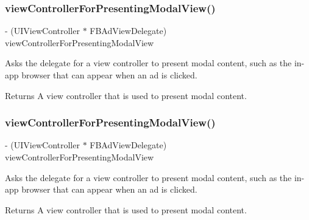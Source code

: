 \subsubsection{\texorpdfstring{view\+Controller\+For\+Presenting\+Modal\+View()}{viewControllerForPresentingModalView()}\hspace{0.1cm}{\footnotesize\ttfamily [2/5]}}
{\footnotesize\ttfamily -\/ (U\+I\+View\+Controller $\ast$ F\+B\+Ad\+View\+Delegate) view\+Controller\+For\+Presenting\+Modal\+View \begin{DoxyParamCaption}{ }\end{DoxyParamCaption}\hspace{0.3cm}{\ttfamily [optional]}}

Asks the delegate for a view controller to present modal content, such as the in-\/app browser that can appear when an ad is clicked.

\begin{DoxyReturn}{Returns}
A view controller that is used to present modal content. 
\end{DoxyReturn}
\mbox{\label{protocolFBAdViewDelegate_01-p_abb65fb95527f0571d4a298beb1e6e299}} 
\subsubsection{\texorpdfstring{view\+Controller\+For\+Presenting\+Modal\+View()}{viewControllerForPresentingModalView()}\hspace{0.1cm}{\footnotesize\ttfamily [3/5]}}
{\footnotesize\ttfamily -\/ (U\+I\+View\+Controller $\ast$ F\+B\+Ad\+View\+Delegate) view\+Controller\+For\+Presenting\+Modal\+View \begin{DoxyParamCaption}{ }\end{DoxyParamCaption}\hspace{0.3cm}{\ttfamily [optional]}}

Asks the delegate for a view controller to present modal content, such as the in-\/app browser that can appear when an ad is clicked.

\begin{DoxyReturn}{Returns}
A view controller that is used to present modal content. 
\end{DoxyReturn}
\mbox{\label{protocolFBAdViewDelegate_01-p_abb65fb95527f0571d4a298beb1e6e299}} 
